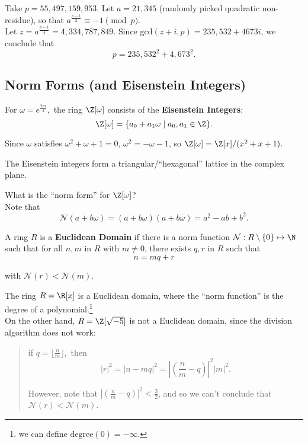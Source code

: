 \documentclass[11pt]{article}
\begin{document}
\begin{eg}
Take $p = 55, 497, 159, 953$. Let $a = 21, 345$ (randomly picked quadratic non-residue), so that $a^{\frac{p-1}{2}} \equiv -1 \pmod p$. \\

Let $z = a^{\frac{p-1}{4}} = 4,334,787,849.$ Since $\mathrm{gcd}(z+i, p) = 235,532 + 4673i$, we conclude that
\[
    p = 235,532^2 + 4,673^2.
\] 
\end{eg}

\subsection{Norm Forms (and Eisenstein Integers)}

\begin{definition}
For $\omega = e^{\frac{2\pi i}{3}},$ the ring $\Z[\omega]$ consists of the \textbf{Eisenstein Integers}:
\[
    \Z[\omega] = \{ a_0 + a_1 \omega \mid a_0, a_1 \in \Z \}.
\] 

Since $\omega$ satisfies $\omega^2 + \omega + 1 = 0$, $\omega^2 = -\omega - 1$, so $\Z[\omega] = \Z[x] / (x^2 + x + 1).$
\end{definition}

\begin{remark}
The Eisenstein integers form a triangular/``hexagonal'' lattice in the complex plane.
\end{remark}

\begin{exercise}
What is the ``norm form'' for $\Z[\omega]$? \\

Note that 
\[
    \mathcal{N}(a + b\omega) = (a+b\omega)(a+b \overline{\omega}) = a^2 - ab + b^2.
\]
\end{exercise}

\begin{definition}
A ring $R$ is a \textbf{Euclidean Domain} if there is a norm function $\mathcal{N}: R \setminus \{ 0 \} \mapsto \N$
such that for all $n, m$ in $R$ with $m \neq 0$, there exists $q, r$ in $R$ such that
\[
    n = mq + r
\]

with $\mathcal{N}(r) < \mathcal{N}(m).$
\end{definition}

\begin{remark}
The ring $R = \R[x]$ is a Euclidean domain, where the ``norm function'' is the degree of a polynomial.\footnote{we can define $\mathrm{degree}(0) = -\infty$.} \\

On the other hand, $R = \Z[\sqrt{-5}]$ is not a Euclidean domain, since the division algorithm does not work:    \begin{quote}
    if $q = \lfloor \frac{n}{m} \rfloor,$ then 
    \[
        |r|^2 = |n - mq|^2 = \left| \left( \frac{n}{m} - q \right) \right|^2 |m|^2.
    \]

    However, note that $\left| \left( \frac{n}{m} - q \right) \right|^2 < \frac{3}{2}$, and so we can't conclude that $\mathcal{N}(r) < \mathcal{N}(m)$.
    \end{quote}
\end{remark}
\end{document}

